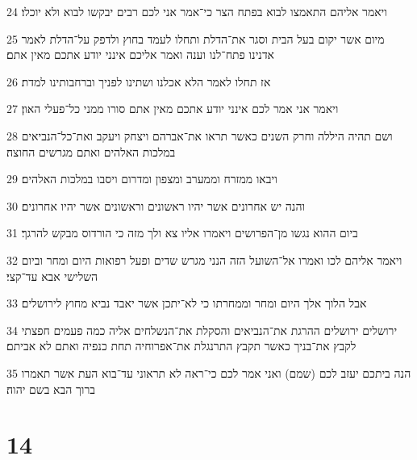 \par 24 ויאמר אליהם התאמצו לבוא בפתח הצר כי־אמר אני לכם רבים יבקשו לבוא ולא יוכלו׃
\par 25 מיום אשר יקום בעל הבית וסגר את־הדלת ותחלו לעמד בחוץ ולדפק על־הדלת לאמר אדנינו פתח־לנו וענה ואמר אליכם אינני יודע אתכם מאין אתם׃
\par 26 אז תחלו לאמר הלא אכלנו ושתינו לפניך וברחבותינו למדת׃
\par 27 ויאמר אני אמר לכם אינני יודע אתכם מאין אתם סורו ממני כל־פעלי האון׃
\par 28 ושם תהיה היללה וחרק השנים כאשר תראו את־אברהם ויצחק ויעקב ואת־כל־הנביאים במלכות האלהים ואתם מגרשים החוצה׃
\par 29 ויבאו ממזרח וממערב ומצפון ומדרום ויסבו במלכות האלהים׃
\par 30 והנה יש אחרונים אשר יהיו ראשונים וראשונים אשר יהיו אחרונים׃
\par 31 ביום ההוא נגשו מן־הפרושים ויאמרו אליו צא ולך מזה כי הורדוס מבקש להרגך׃
\par 32 ויאמר אליהם לכו ואמרו אל־השועל הזה הנני מגרש שדים ופעל רפואות היום ומחר וביום השלישי אבא עד־קצי׃
\par 33 אבל הלוך אלך היום ומחר וממחרתו כי לא־יתכן אשר יאבד נביא מחוץ לירושלים׃
\par 34 ירושלים ירושלים ההרגת את־הנביאים והסקלת את־הנשלחים אליה כמה פעמים חפצתי לקבץ את־בניך כאשר תקבץ התרנגלת את־אפרוחיה תחת כנפיה ואתם לא אביתם׃
\par 35 הנה ביתכם יעזב לכם (שמם) ואני אמר לכם כי־ראה לא תראוני עד־בוא העת אשר תאמרו ברוך הבא בשם יהוה׃

\chapter{14}

